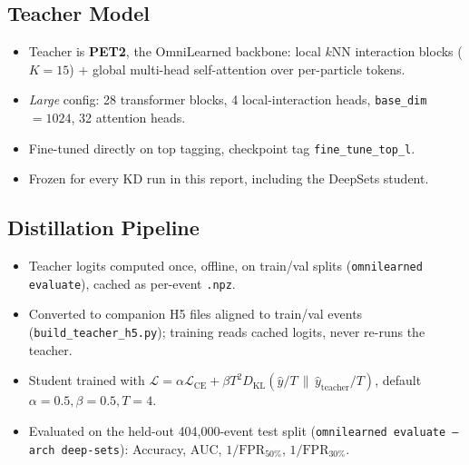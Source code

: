 
\subsection{Teacher Model}
\label{sec:teacher}

\begin{itemize}
    \item Teacher is \textbf{PET2}, the OmniLearned backbone: local $k$NN
    interaction blocks ($K{=}15$) + global multi-head self-attention over
    per-particle tokens.
    \item \emph{Large} config: 28 transformer blocks, 4 local-interaction
    heads, \texttt{base\_dim}$=1024$, 32 attention heads.
    \item Fine-tuned directly on top tagging, checkpoint tag
    \texttt{fine\_tune\_top\_l}.
    \item Frozen for every KD run in this report, including the DeepSets
    student.
\end{itemize}

\subsection{Distillation Pipeline}
\label{sec:pipeline}

\begin{itemize}
    \item Teacher logits computed once, offline, on train/val splits
    (\texttt{omnilearned evaluate}), cached as per-event \texttt{.npz}.
    \item Converted to companion H5 files aligned to train/val events
    (\texttt{build\_teacher\_h5.py}); training reads cached logits, never
    re-runs the teacher.
    \item Student trained with
    $\mathcal{L}=\alpha\mathcal{L}_{\mathrm{CE}}+\beta T^2 D_{\mathrm{KL}}(\hat y/T\,\|\,\hat y_{\mathrm{teacher}}/T)$,
    default $\alpha{=}0.5,\beta{=}0.5,T{=}4$.
    \item Evaluated on the held-out 404{,}000-event test split
    (\texttt{omnilearned evaluate --arch deep-sets}): Accuracy, AUC,
    $1/\mathrm{FPR}_{50\%}$, $1/\mathrm{FPR}_{30\%}$.
\end{itemize}

